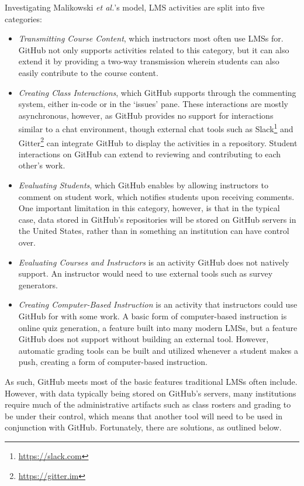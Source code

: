 Investigating Malikowski \textit{et al.}'s \cite{malikowski2007model} model, LMS activities are split into five categories:
\begin{itemize}
\item \emph{Transmitting Course Content}, which instructors most often use LMSs for. GitHub not only supports activities related to this category, but it can also extend it by providing a two-way transmission wherein students can also easily contribute to the course content.
\item \emph{Creating Class Interactions}, which GitHub supports through the commenting system, either in-code or in the `issues' pane. These interactions are mostly asynchronous, however, as GitHub provides no support for interactions similar to a chat environment, though external chat tools such as Slack\footnote{\url{https://slack.com}} and Gitter\footnote{\url{https://gitter.im}} can integrate GitHub to display the activities in a repository. Student interactions on GitHub can extend to reviewing and contributing to each other's work.
\item \emph{Evaluating Students}, which GitHub enables by allowing instructors to comment on student work, which notifies students upon receiving comments. One important limitation in this category, however, is that in the typical case, data stored in GitHub's repositories will be stored on GitHub servers in the United States, rather than in something an institution can have control over.
\item \emph{Evaluating Courses and Instructors} is an activity GitHub does not natively support. An instructor would need to use external tools such as survey generators.
\item \emph{Creating Computer-Based Instruction} is an activity that instructors could use GitHub for with some work. A basic form of computer-based instruction is online quiz generation, a feature built into many modern LMSs, but a feature GitHub does not support without building an external tool. However, automatic grading tools can be built and utilized whenever a student makes a push, creating a form of computer-based instruction.
\end{itemize}

As such, GitHub meets most of the basic features traditional LMSs often include. However, with data typically being stored on GitHub's servers, many institutions require much of the administrative artifacts such as class rosters and grading to be under their control, which means that another tool will need to be used in conjunction with GitHub. Fortunately, there are solutions, as outlined below.

